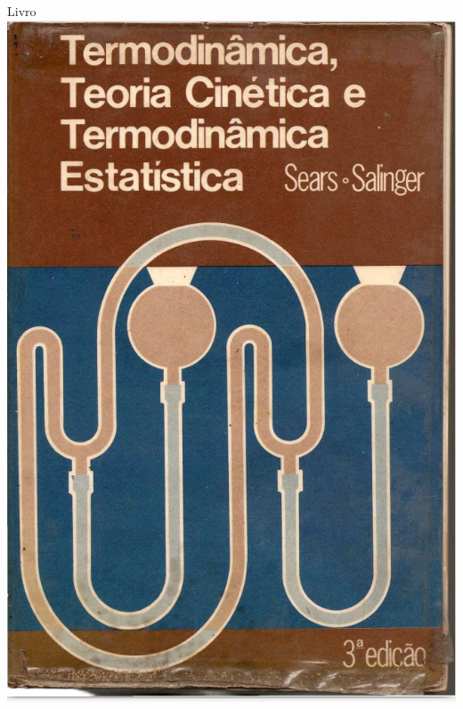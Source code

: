 \documentclass[t,%
brazilian,%
11pt,%
aspectratio=169,%
table%
]{beamer}
\begin{document}
\begin{frame}{Livro}
    \centering
    \includegraphics[height=0.8\textheight]{images/Captura de tela de 2023-03-27 07-48-28.png}
\end{frame}
\end{document}
